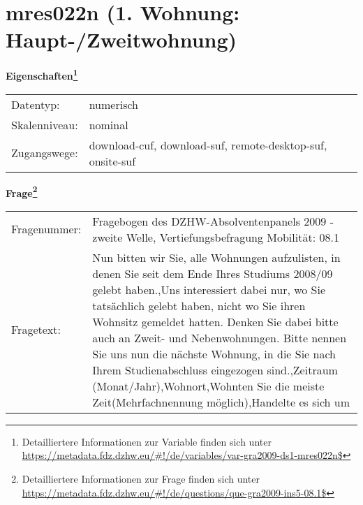 
    \setcounter{footnote}{0}

    \vspace*{-1.8cm}
	\section{mres022n (1. Wohnung: Haupt-/Zweitwohnung)}
	\label{section:mres022n}



    \vspace*{0.5cm}
    \noindent\textbf{Eigenschaften\footnote{Detailliertere Informationen zur Variable finden sich unter
		\url{https://metadata.fdz.dzhw.eu/\#!/de/variables/var-gra2009-ds1-mres022n$}}}\\
	\begin{tabularx}{\hsize}{@{}lX}
	Datentyp: & numerisch \\
	Skalenniveau: & nominal \\
	Zugangswege: &
	  download-cuf, 
	  download-suf, 
	  remote-desktop-suf, 
	  onsite-suf
 \\
    \end{tabularx}



				\vspace*{0.5cm}
                \noindent\textbf{Frage\footnote{Detailliertere Informationen zur Frage finden sich unter
		              \url{https://metadata.fdz.dzhw.eu/\#!/de/questions/que-gra2009-ins5-08.1$}}}\\
				\begin{tabularx}{\hsize}{@{}lX}
					Fragenummer: &
					  Fragebogen des DZHW-Absolventenpanels 2009 - zweite Welle, Vertiefungsbefragung Mobilität:
					  08.1
 \\
					Fragetext: & Nun bitten wir Sie, alle Wohnungen aufzulisten, in denen Sie seit dem Ende Ihres Studiums 2008/09 gelebt haben.,Uns interessiert dabei nur, wo Sie tatsächlich gelebt haben, nicht wo Sie ihren Wohnsitz gemeldet hatten. Denken Sie dabei bitte auch an Zweit- und Nebenwohnungen. Bitte nennen Sie uns nun die nächste Wohnung, in die Sie nach Ihrem Studienabschluss eingezogen sind.,Zeitraum (Monat/Jahr),Wohnort,Wohnten Sie die meiste Zeit(Mehrfachnennung möglich),Handelte es sich um \\
				\end{tabularx}





